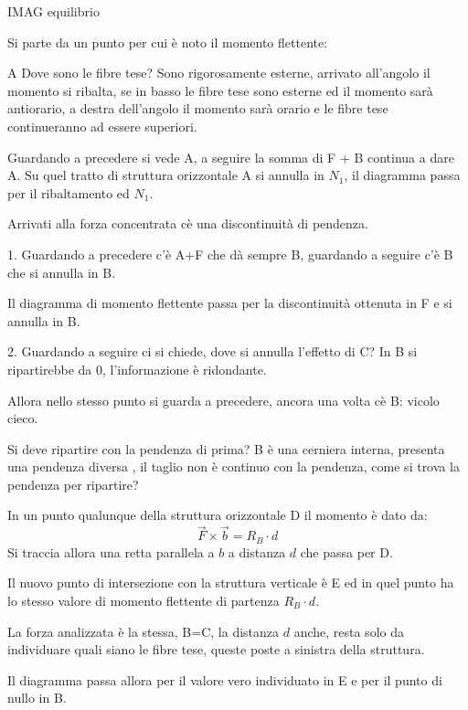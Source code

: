 \documentclass{article}
\begin{document}
\begin{adjustwidth}{2in}{}
	IMAG equilibrio
	
	Si parte da un punto per cui è noto il momento flettente:
	\item[A] Dove sono le fibre tese? Sono rigorosamente esterne, arrivato all'angolo il momento si ribalta, se in basso le fibre tese sono esterne ed il momento sarà antiorario, a destra dell'angolo il momento sarà orario e le fibre tese continueranno ad essere superiori.\newline 
	
	Guardando a precedere si vede A, a seguire la somma di F + B continua a dare A. Su quel tratto di struttura orizzontale A si annulla in $N_1$, il diagramma passa per il ribaltamento ed $N_1$. 
	
	Arrivati alla forza concentrata cè una discontinuità di pendenza. 
	
	\item[1.] Guardando a precedere c'è A+F che dà sempre B, guardando a seguire c'è B che si annulla in B. 
	
	Il diagramma di momento flettente passa per la discontinuità ottenuta in F e si annulla in B. 
	
	\item[2.] Guardando a seguire ci si chiede, dove si annulla l'effetto di C? In B si ripartirebbe da 0, l'informazione è ridondante. 
	
	Allora nello stesso punto si guarda a precedere, ancora una volta cè B: vicolo cieco.\newline
	
	Si deve ripartire con la pendenza di prima? B è una cerniera interna, presenta una pendenza diversa , il taglio non è continuo con la pendenza, come si trova la pendenza per ripartire? \newline 
	
	In un punto qualunque della struttura orizzontale D il momento è dato da: \[\vec{F}\times\vec{b} = R_B\cdot d\]
	Si traccia allora una retta parallela a $b$ a distanza $d$ che passa per D.\newline 
	
	Il nuovo punto di intersezione con la struttura verticale è E ed in quel punto ha lo stesso valore di momento flettente di partenza $R_B\cdot d$. 
	
	La forza analizzata è la stessa, B=C, la distanza $ d $ anche, resta solo da individuare quali siano le fibre tese, queste poste a sinistra della struttura. \newline 
	
	Il diagramma passa allora per il valore vero individuato in E e per il punto di nullo in B.
	

\end{adjustwidth}
\end{document}
